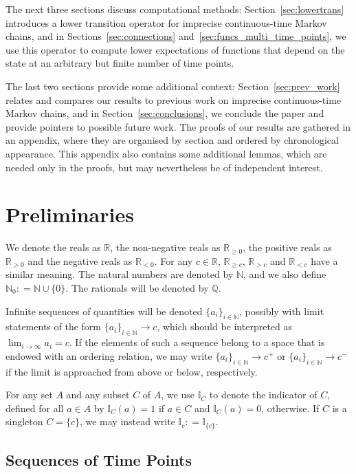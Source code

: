 \documentclass[10pt,a4paper]{paper}
\theoremstyle{definition}
\newcommand{\nats}{\mathbb{N}}
\newcommand{\reals}{\mathbb{R}}
\newcommand{\realspos}{\reals_{>0}}
\newcommand{\realsnonneg}{\reals_{\geq 0}}
\newcommand{\ind}[1]{\mathbb{I}_{#1}}
\newcommand{\coloneqq}{:\!=}
\begin{document}
The next three sections discuss computational methods: Section~\ref{sec:lowertrans} introduces a lower transition operator for imprecise continuous-time Markov chains, and in Sections~\ref{sec:connections} and~\ref{sec:funcs_multi_time_points}, we use this operator to compute lower expectations of functions that depend on the state at an arbitrary but finite number of time points. 

The last two sections provide some additional context: Section~\ref{sec:prev_work} relates and compares our results to previous work on imprecise continuous-time Markov chains, and in
Section~\ref{sec:conclusions}, we conclude the paper and provide pointers to possible future work. The proofs of our results are gathered in an appendix, where they are organised by section and ordered by chronological appearance. This appendix also contains some additional lemmas, which are needed only in the proofs, but may nevertheless be of independent interest.

\section{Preliminaries}\label{sec:prelim}

We denote the reals as $\reals$, the non-negative reals as $\realsnonneg$, the positive reals as $\realspos$ and the negative reals as $\reals_{<0}$. For any $c\in\reals$, $\reals_{\geq c}$, $\reals_{>c}$ and $\reals_{<c}$ have a similar meaning. The natural numbers are denoted by $\nats$, and we also define $\nats_0\coloneqq\nats\cup\{0\}$. The rationals will be denoted by $\mathbb{Q}$.

Infinite sequences of quantities will be denoted $\{a_i\}_{i\in\nats}$, possibly with limit statements of the form $\{a_i\}_{i\in\nats}\to c$, which should be interpreted as $\lim_{i\to\infty}a_i=c$. If the elements of such a sequence belong to a space that is endowed with an ordering relation, we may write $\{a_i\}_{i\in\nats}\to c^+$ or $\{a_i\}_{i\in\nats}\to c^-$ if the limit is approached from above or below, respectively.

For any set $A$ and any subset $C$ of $A$, we use $\ind{C}$ to denote the indicator of $C$, defined for all $a\in A$ by $\ind{C}(a)=1$ if $a\in C$ and $\ind{C}(a)=0$, otherwise. If $C$ is a singleton $C=\{c\}$, we may instead write $\ind{c}\coloneqq\ind{\{c\}}$.

\subsection{Sequences of Time Points}\label{subsec:sequencesoftimepoints}
\end{document}
